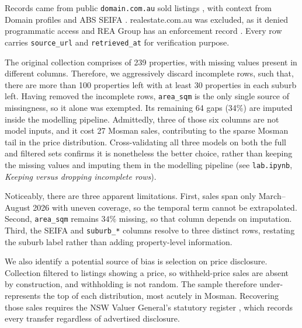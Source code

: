 Records came from public \texttt{domain.com.au} sold listings \cite{domain2026sold},
with context from Domain profiles \cite{domain2026suburb} and ABS SEIFA
\cite{abs2021seifa}. realestate.com.au was excluded, as it denied programmatic access and
REA Group has an enforcement record \cite{om2024rea}. Every row carries
\texttt{source\_url} and \texttt{retrieved\_at} for verification purpose.

The original collection comprises of 239 properties, with missing values present in different columns.
Therefore, we aggressively discard incomplete rows, such that, there are more than 100 properties left with at least 30 properties in each suburb left.
Having removed the incomplete rows, \texttt{area\_sqm} is the only single source of missingness, so it
alone was exempted. Its remaining 64 gaps (34\%) are imputed inside the modelling pipeline.
Admittedly, three of those six columns are not model inputs, and it cost 27 Mosman sales, contributing to the sparse Mosman tail in the price distribution. Cross-validating
all three models on both the full and filtered sets confirms it is nonetheless the better choice, rather than keeping the missing values and imputing them
in the modelling pipeline (see \texttt{lab.ipynb}, \emph{Keeping versus dropping incomplete rows}).

Noticeably, there are three apparent limitations. First, sales span only March--August 2026 with uneven coverage, so
the temporal term cannot be extrapolated. Second, \texttt{area\_sqm} remains $34\%$ missing, so that column depends on imputation.
Third, the SEIFA and \texttt{suburb\_*} columns resolve to three distinct rows, restating the suburb label rather than adding property-level information.

We also identify a potential source of bias is selection on price disclosure. Collection filtered to
listings showing a price, so withheld-price sales are absent by construction, and withholding is not random. The sample therefore under-represents the top of each distribution, most acutely in Mosman.
Recovering those sales requires the NSW Valuer General's statutory register \cite{vgnsw2026psi}, which records every transfer regardless of advertised disclosure.
